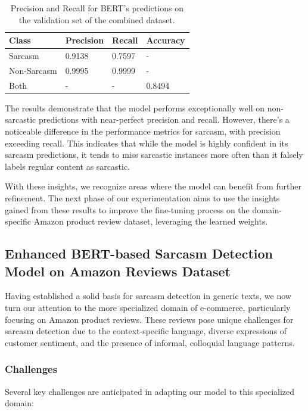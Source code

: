 \documentclass[10pt,twocolumn,letterpaper]{article}
\begin{document}
\begin{table}[H]  
    \centering  
    \begin{tabularx}{\linewidth}{|X|X|X|X|}  
        \hline  
        Class & Precision & Recall & Accuracy \\  
        \hline  
        Sarcasm & 0.9138 & 0.7597 & - \\  
        \hline  
        Non-Sarcasm & 0.9995 & 0.9999 & - \\  
        \hline  
        Both & - & - & 0.8494 \\  
        \hline  
    \end{tabularx}  
    \caption{Precision and Recall for BERT's predictions on the validation set of the combined dataset.}  
\end{table}

The results demonstrate that the model performs exceptionally well on non-sarcastic predictions with near-perfect precision and recall. However, there's a noticeable difference in the performance metrics for sarcasm, with precision exceeding recall. This indicates that while the model is highly confident in its sarcasm predictions, it tends to miss sarcastic instances more often than it falsely labels regular content as sarcastic.

With these insights, we recognize areas where the model can benefit from further refinement. The next phase of our experimentation aims to use the insights gained from these results to improve the fine-tuning process on the domain-specific Amazon product review dataset, leveraging the learned weights.

\subsection{Enhanced BERT-based Sarcasm Detection Model on Amazon Reviews Dataset}
Having established a solid basis for sarcasm detection in generic texts, we now turn our attention to the more specialized domain of e-commerce, particularly focusing on Amazon product reviews. These reviews pose unique challenges for sarcasm detection due to the context-specific language, diverse expressions of customer sentiment, and the presence of informal, colloquial language patterns.

\subsubsection{Challenges}
Several key challenges are anticipated in adapting our model to this specialized domain:
\end{document}
